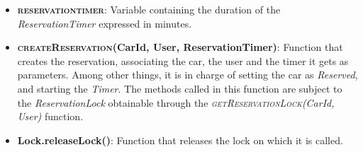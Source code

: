 \begin{itemize}
	\item \textbf{\textsc{reservation\textunderscore timer}}: Variable containing the duration of the
                                                            \textit{ReservationTimer} expressed in
                                                            minutes.
  \item \textbf{\textsc{createReservation}(CarId, User, ReservationTimer)}: Function that creates the
                                                                            reservation, associating the
                                                                            car, the user and the timer
                                                                            it gets as parameters.
                                                                            Among other things, it is
                                                                            in charge of setting the car
                                                                            as \textit{Reserved}, and
                                                                            starting the \textit{Timer}.
                                                                            The methods called in this
                                                                            function are subject to
                                                                            the \textit{ReservationLock}
                                                                            obtainable through the
                                                                            \textit{\textsc{getReservationLock}(CarId, User)}
                                                                            function.
	\item \textbf{Lock.releaseLock()}: Function that releases the lock on which it is called.
\end{itemize}

\pagebreak
